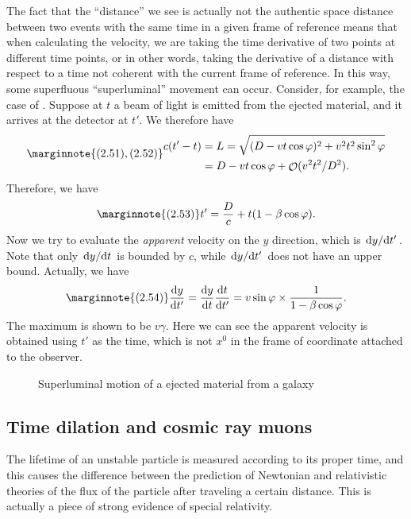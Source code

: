 \documentclass[hyperref, a4paper]{article}
\DeclareMathOperator{\bigO}{\mathcal{O}}
\begin{document}
The fact that the ``distance'' we see is actually not the authentic space distance between two events with the 
same time in a given frame of reference means that when calculating the velocity, we are taking the time
derivative of two points at different time points, or in other words, taking the derivative of a distance 
with respect to a time not coherent with the current frame of reference. In this way, some superfluous
``superluminal'' movement can occur. Consider, for example, the case of . 
Suppose at $t$ a beam of light is emitted from the ejected material, and it arrives at the detector at $t'$.
We therefore have 
\begin{equation} \marginnote{(2.51), (2.52)}
    \begin{aligned}
        c(t' - t) &= L = \sqrt{(D - vt \cos \varphi)^2 + v^2 t^2 \sin^2 \varphi} \\
        &= D - vt \cos \varphi + \bigO(v^2 t^2 / D^2).
    \end{aligned}
\end{equation}
Therefore, we have 
\begin{equation} \marginnote{(2.53)}
    t' = \frac{D}{c} + t (1 - \beta \cos \varphi).
\end{equation}
Now we try to evaluate the \emph{apparent} velocity on the $y$ direction, which is $\dv*{y}{t'}$.
Note that only $\dv*{y}{t}$ is bounded by $c$, while $\dv*{y}{t'}$ does not have an upper bound.
Actually, we have 
\begin{equation} \marginnote{(2.54)}
    \dv{y}{t'} = \dv{y}{t} \dv{t}{t'} = v \sin \varphi \times \frac{1}{1 - \beta \cos \varphi}.
\end{equation}
The maximum is shown to be $v \gamma$. Here we can see the apparent velocity is obtained using $t'$ 
as the time, which is not $x^0$ in the frame of coordinate attached to the observer. 

\begin{figure}
    \centering
    
    \caption{Superluminal motion of a ejected material from a galaxy}
    \label{fig:superluminal}
\end{figure}

\subsection{Time dilation and cosmic ray muons}

The lifetime of an unstable particle is measured according to its proper time, and this causes the difference 
between the prediction of Newtonian and relativistic theories of the flux of the particle after traveling a 
certain distance. This is actually a piece of strong evidence of special relativity.
\end{document}

